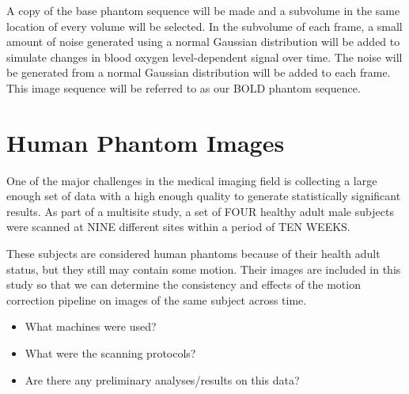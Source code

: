 A copy of the base phantom sequence will be made and a subvolume in the same location of every volume will be selected. In the subvolume of each frame, a small amount of noise generated using a normal Gaussian distribution will be added to simulate changes in blood oxygen level-dependent signal over time. The noise will be generated from a normal Gaussian distribution will be added to each frame. This image sequence will be referred to as our BOLD phantom sequence.

\section{Human Phantom Images}

One of the major challenges in the medical imaging field is collecting a large enough set of data with a high enough quality to generate statistically significant results. As part of a multisite study, a set of FOUR healthy adult male subjects were scanned at NINE different sites within a period of TEN WEEKS.

These subjects are considered human phantoms because of their health adult status, but they still may contain some motion. Their images are included in this study so that we can determine the consistency and effects of the motion correction pipeline on images of the same subject across time.

\begin{itemize}
\item What machines were used?
\item What were the scanning protocols?
\item Are there any preliminary analyses/results on this data?
\end{itemize}

